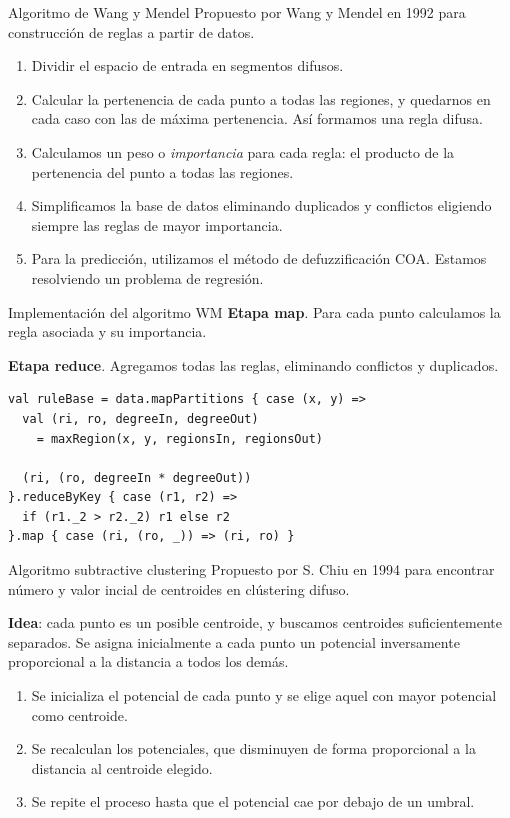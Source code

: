 \documentclass[10pt, spanish]{beamer}
\begin{document}
\begin{frame}{Algoritmo de Wang y Mendel}
  Propuesto por Wang y Mendel en 1992 para construcción de reglas a partir de datos.

  \begin{enumerate}
    \item Dividir el espacio de entrada en segmentos difusos.
    \item Calcular la pertenencia de cada punto a todas las regiones, y quedarnos en cada caso con las de máxima pertenencia. Así formamos una regla difusa.
    \item Calculamos un peso o \textit{importancia} para cada regla: el producto de la pertenencia del punto a todas las regiones.
    \item Simplificamos la base de datos eliminando duplicados y conflictos eligiendo siempre las reglas de mayor importancia.
    \item Para la predicción, utilizamos el método de defuzzificación COA. Estamos resolviendo un problema de regresión.
  \end{enumerate}
\end{frame}



\begin{frame}[fragile]{Implementación del algoritmo WM}
  \textbf{Etapa map}. Para cada punto calculamos la regla asociada y su importancia.

  \textbf{Etapa reduce}. Agregamos todas las reglas, eliminando conflictos y duplicados.

  \vspace{1em}

  \begin{lstlisting}
val ruleBase = data.mapPartitions { case (x, y) =>
  val (ri, ro, degreeIn, degreeOut)
    = maxRegion(x, y, regionsIn, regionsOut)

  (ri, (ro, degreeIn * degreeOut))
}.reduceByKey { case (r1, r2) =>
  if (r1._2 > r2._2) r1 else r2
}.map { case (ri, (ro, _)) => (ri, ro) }
  \end{lstlisting}
\end{frame}


\begin{frame}{Algoritmo subtractive clustering}
  Propuesto por S. Chiu en 1994 para encontrar número y valor incial de centroides en clústering difuso.

  \textbf{Idea}: cada punto es un posible centroide, y buscamos centroides suficientemente separados. Se asigna inicialmente a cada punto un potencial inversamente proporcional a la distancia a todos los demás.

  \pause
  \begin{enumerate}
    \item Se inicializa el potencial de cada punto y se elige aquel con mayor potencial como centroide.
    \item Se recalculan los potenciales, que disminuyen de forma proporcional a la distancia al centroide elegido.
    \item Se repite el proceso hasta que el potencial cae por debajo de un umbral.
  \end{enumerate}
\end{frame}
\end{document}
